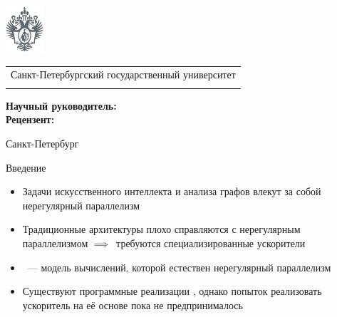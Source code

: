 \documentclass
  [ russian
  , aspectratio=169 %
  ] {beamer}
\title[Lamagraph: Транслятор в Interaction Nets]{\my@title@title@ru}
\author[\my@title@author@ru]{\my@title@author@ru}
\institute[СПбГУ]{}
\date[9 июня 2025 г.]{}
\makeatletter
\newcommand{\advisorChair}{\my@title@chair@ru}
\newcommand{\supervisor}{\my@title@supervisor@ru}
\newcommand{\supervisorPosition}{\my@title@supervisorPosition@ru}
\newcommand{\consultant}{\my@title@consultant@ru}
\newcommand{\consultantPosition}{\my@title@consultantPosition@ru}
\newcommand{\reviewer}{\my@title@reviewer@ru}
\newcommand{\reviewerPosition}{\my@title@reviewerPosition@ru}
\newcommand{\defenseYear}{\my@title@year@ru}
\makeatother
\begin{document}
{
\begin{frame}
    \includegraphics[width=1.4cm]{figures/герб_серый.png}
    \vspace{-35pt}
    \hspace{-10pt}
    \begin{center}
        \begin{tabular}{c}
            \scriptsize{Санкт-Петербургский государственный университет} \\
            \scriptsize{\advisorChair}
        \end{tabular}
        \titlepage
    \end{center}

    \btVFill

    {\scriptsize
        \textbf{Научный руководитель:} \supervisorPosition~\supervisor \\
        \textbf{Рецензент:} \reviewerPosition~\reviewer \\
    }
    \makeatother
    \begin{center}
        \vspace{5pt}
        \scriptsize{Санкт-Петербург\\ \defenseYear}
    \end{center}
\end{frame}
}

\begin{frame}{Введение}

    \begin{itemize}
        \item Задачи искусственного интеллекта и анализа графов влекут за собой нерегулярный параллелизм
        \item Традиционные архитектуры плохо справляются с нерегулярным параллелизмом $\implies$~требуются специализированные ускорители
        \item \INs{}~--- модель вычислений, которой естествен нерегулярный параллелизм
        \item Существуют программные реализации \INs{}, однако попыток реализовать ускоритель на её основе пока не предпринималось
    \end{itemize}

\end{frame}
\end{document}
